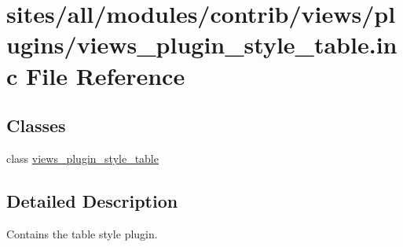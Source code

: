 \hypertarget{views__plugin__style__table_8inc}{
\section{sites/all/modules/contrib/views/plugins/views\_\-plugin\_\-style\_\-table.inc File Reference}
\label{views__plugin__style__table_8inc}
}
\subsection*{Classes}
\begin{CompactItemize}
\item 
class \hyperlink{classviews__plugin__style__table}{views\_\-plugin\_\-style\_\-table}
\end{CompactItemize}


\subsection{Detailed Description}
Contains the table style plugin. 